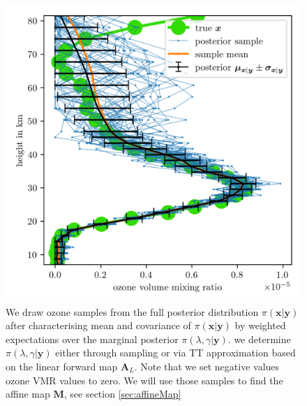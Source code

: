 \begin{figure}[ht!]
	\centering
	\includegraphics{FirstTestRes.png}
	\caption[Ozone samples of the full posterior.]{We draw ozone samples from the full posterior distribution $\pi(\bm{x}| \bm{y})$ after characterising mean and covariance of $\pi(\bm{x}| \bm{y})$ by weighted expectations over the marginal posterior $\pi(\lambda,\gamma | \bm{y})$. we determine  $\pi(\lambda,\gamma | \bm{y})$ either through sampling or via TT approximation based on the linear forward map $\bm{A}_L$. Note that we set negative values ozone VMR values to zero. We will use those samples to find the affine map $\bm{M}$, see section \ref{sec:affineMap}}
	\label{fig:O3Samp}
\end{figure}
\clearpage
%

